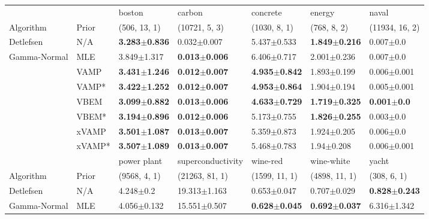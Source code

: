 \begin{tabular}{lllllll}
\toprule
             &        &                    boston &                    carbon &                  concrete &                    energy &                   naval \\
Algorithm & Prior& (506, 13, 1)& (10721, 5, 3)& (1030, 8, 1)& (768, 8, 2)& (11934, 16, 2)\\
\midrule
Detlefsen & N/A &  \textbf{3.283$\pm$0.836} &           0.032$\pm$0.007 &           5.437$\pm$0.533 &  \textbf{1.849$\pm$0.216} &           0.007$\pm$0.0 \\
Gamma-Normal & MLE &           3.849$\pm$1.317 &  \textbf{0.013$\pm$0.006} &           6.406$\pm$0.717 &           2.001$\pm$0.236 &           0.007$\pm$0.0 \\
             & VAMP &  \textbf{3.431$\pm$1.246} &  \textbf{0.012$\pm$0.007} &  \textbf{4.935$\pm$0.842} &           1.893$\pm$0.199 &         0.006$\pm$0.001 \\
             & VAMP* &  \textbf{3.422$\pm$1.252} &  \textbf{0.012$\pm$0.007} &  \textbf{4.953$\pm$0.864} &           1.904$\pm$0.194 &         0.005$\pm$0.001 \\
             & VBEM &  \textbf{3.099$\pm$0.882} &  \textbf{0.013$\pm$0.006} &  \textbf{4.633$\pm$0.729} &  \textbf{1.719$\pm$0.325} &  \textbf{0.001$\pm$0.0} \\
             & VBEM* &  \textbf{3.194$\pm$0.896} &  \textbf{0.012$\pm$0.006} &           5.173$\pm$0.755 &  \textbf{1.826$\pm$0.255} &           0.003$\pm$0.0 \\
             & xVAMP &  \textbf{3.501$\pm$1.087} &  \textbf{0.013$\pm$0.007} &           5.359$\pm$0.873 &           1.924$\pm$0.205 &           0.006$\pm$0.0 \\
             & xVAMP* &  \textbf{3.507$\pm$1.089} &  \textbf{0.013$\pm$0.007} &           5.468$\pm$0.783 &            1.94$\pm$0.208 &         0.006$\pm$0.001 \\
\midrule
             &        &               power plant &          superconductivity &                  wine-red &                wine-white &                     yacht \\
Algorithm & Prior& (9568, 4, 1)& (21263, 81, 1)& (1599, 11, 1)& (4898, 11, 1)& (308, 6, 1)\\
\midrule
Detlefsen & N/A &             4.248$\pm$0.2 &           19.313$\pm$1.163 &           0.653$\pm$0.047 &           0.707$\pm$0.029 &  \textbf{0.828$\pm$0.243} \\
Gamma-Normal & MLE &           4.056$\pm$0.132 &           15.551$\pm$0.507 &  \textbf{0.628$\pm$0.045} &  \textbf{0.692$\pm$0.037} &           6.316$\pm$1.342 \\

\end{tabular}
